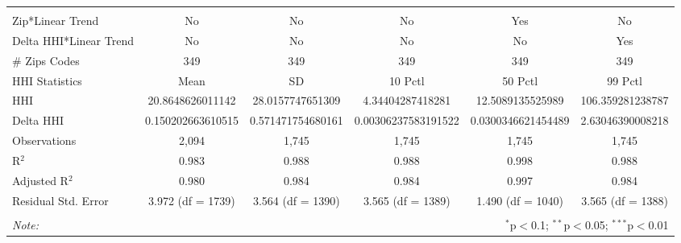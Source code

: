 \begin{table}[H]
{\begin{tabular}{@{\extracolsep{5pt}}lccccc}
   & & & & & \\  

 \hline \\[-1.8ex]  

 Zip*Linear Trend & No & No & No & Yes & No \\  

 Delta HHI*Linear Trend & No & No & No & No & Yes \\  

 # Zips Codes & 349 & 349 & 349 & 349 & 349 \\  

 HHI Statistics & Mean & SD & 10 Pctl & 50 Pctl & 99 Pctl \\  

 HHI & 20.8648626011142 & 28.0157747651309 & 4.34404287418281 & 12.5089135525989 & 106.359281238787 \\  

 Delta HHI & 0.150202663610515 & 0.571471754680161 & 0.00306237583191522 & 0.0300346621454489 & 2.63046390008218 \\  

 Observations & 2,094 & 1,745 & 1,745 & 1,745 & 1,745 \\  

 R$^{2}$ & 0.983 & 0.988 & 0.988 & 0.998 & 0.988 \\  

 Adjusted R$^{2}$ & 0.980 & 0.984 & 0.984 & 0.997 & 0.984 \\  

 Residual Std. Error & 3.972 (df = 1739) & 3.564 (df = 1390) & 3.565 (df = 1389) & 1.490 (df = 1040) & 3.565 (df = 1388) \\  

 \hline  

 \hline \\[-1.8ex]  

 \textit{Note:}  & \multicolumn{5}{r}{$^{*}$p$<$0.1; $^{**}$p$<$0.05; $^{***}$p$<$0.01} \\  

 \end{tabular}}  

 \end{table}  

 



